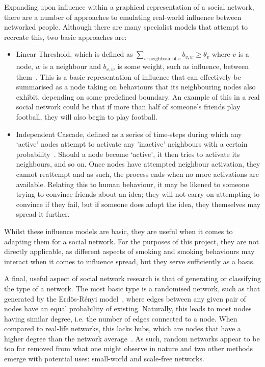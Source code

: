 \documentclass[]{report}
\begin{document}
Expanding upon influence within a graphical representation of a social network, there are a number of approaches to emulating real-world influence between networked people. Although there are many specialist models that attempt to recreate this, two basic approaches are:
\begin{itemize}
\item Linear Threshold, which is defined as $\sum\limits_{w \text{ neighbour of } v}^{} b_{v,w} \geq \theta_{v} $ where $v$ is a node, $w$ is a neighbour and $b_{v,w}$ is some weight, such as influence, between them~\cite{inf-papers}. This is a basic representation of influence that can effectively be summarised as a node taking on behaviours that its neighbouring nodes also exhibit, depending on some predefined boundary. An example of this in a real social network could be that if more than half of someone's friends play football, they will also begin to play football.
\item Independent Cascade, defined as a series of time-steps during which any `active' nodes attempt to activate any 'inactive' neighbours with a certain probability~\cite{inf-papers}. Should a node become `active', it then tries to activate its neighbours, and so on. Once nodes have attempted neighbour activation, they cannot reattempt and as such, the process ends when no more activations are available. Relating this to human behaviour, it may be likened to someone trying to convince friends about an idea; they will not carry on attempting to convince if they fail, but if someone does adopt the idea, they themselves may spread it further.
\end{itemize}
Whilst these influence models are basic, they are useful when it comes to adapting them for a social network. For the purposes of this project, they are not directly applicable, as different aspects of smoking and smoking behaviours may interact when it comes to influence spread, but they serve sufficiently as a basis.


A final, useful aspect of social network research is that of generating or classifying the type of a network. The most basic type is a randomised network, such as that generated by the Erd\"{o}s-R\'{e}nyi model~\cite{erdos}, where edges between any given pair of nodes have an equal probability of existing. Naturally, this leads to most nodes having similar degree, i.e. the number of edges connected to a node. When compared to real-life networks, this lacks hubs, which are nodes that have a higher degree than the network average~\cite{BA-SciAm}. As such, random networks appear to be too far removed from what one might observe in nature and two other methods emerge with potential uses: small-world and scale-free networks.
\end{document}
